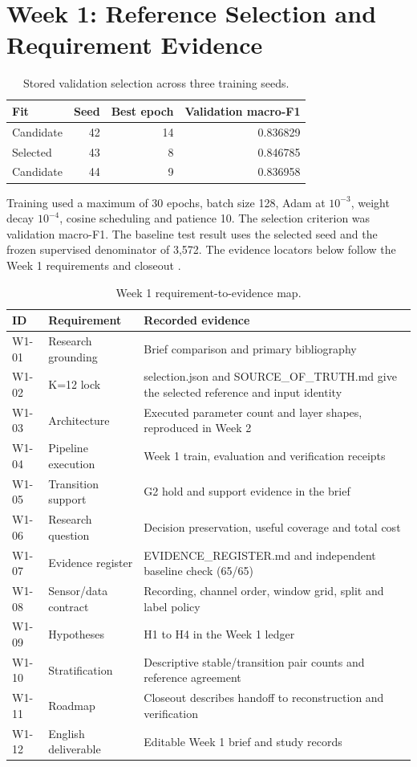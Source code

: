 \section{Week 1: Reference Selection and Requirement Evidence}
\begin{table}[H]
\caption{Stored validation selection across three training seeds.}
\centering\small
\begin{tabularx}{\textwidth}{@{}Yrrr@{}}\toprule
Fit & Seed & Best epoch & Validation macro-F1\\
\midrule
Candidate & 42 & 14 & 0.836829\\
Selected & 43 & 8 & 0.846785\\
Candidate & 44 & 9 & 0.836958\\
\bottomrule\end{tabularx}
\end{table}
Training used a maximum of 30 epochs, batch size 128, Adam at \(10^{-3}\), weight decay \(10^{-4}\), cosine scheduling and patience 10. The selection criterion was validation macro-F1. The baseline test result uses the selected seed and the frozen supervised denominator of 3,572. The evidence locators below follow the Week 1 requirements and closeout \cite{localw1}.
\begin{table}[H]
\caption{Week 1 requirement-to-evidence map.}
\centering\small
\begin{tabularx}{\textwidth}{@{}lYY@{}}\toprule
ID & Requirement & Recorded evidence\\
\midrule
W1-01 & Research grounding & Brief comparison and primary bibliography\\
W1-02 & K=12 lock & selection.json and SOURCE\_OF\_TRUTH.md give the selected reference and input identity\\
W1-03 & Architecture & Executed parameter count and layer shapes, reproduced in Week 2\\
W1-04 & Pipeline execution & Week 1 train, evaluation and verification receipts\\
W1-05 & Transition support & G2 hold and support evidence in the brief\\
W1-06 & Research question & Decision preservation, useful coverage and total cost\\
W1-07 & Evidence register & EVIDENCE\_REGISTER.md and independent baseline check (65/65)\\
W1-08 & Sensor/data contract & Recording, channel order, window grid, split and label policy\\
W1-09 & Hypotheses & H1 to H4 in the Week 1 ledger\\
W1-10 & Stratification & Descriptive stable/transition pair counts and reference agreement\\
W1-11 & Roadmap & Closeout describes handoff to reconstruction and verification\\
W1-12 & English deliverable & Editable Week 1 brief and study records\\
\bottomrule\end{tabularx}
\end{table}
